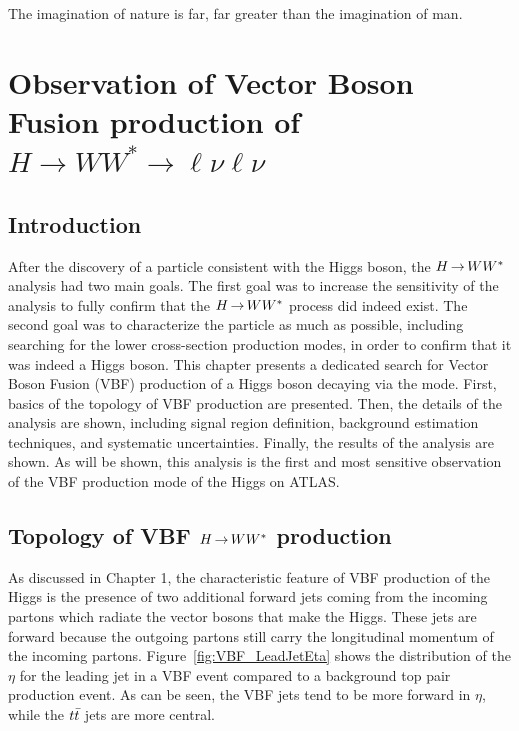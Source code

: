 \begin{savequote}[75mm]
The imagination of nature is far, far greater than the imagination of man.
\end{savequote}

\chapter{Observation of Vector Boson Fusion production of $H\rightarrow WW^{*}\rightarrow \ell\nu\ell\nu$}

\section{Introduction}

After the discovery of a particle consistent with the Higgs boson, the $H{\,{\rightarrow}\,}WW^\ast$ analysis had two main goals. The first goal was to increase the sensitivity of the analysis to fully confirm that the $H{\,{\rightarrow}\,}WW^\ast$ process did indeed exist. The second goal was to characterize the particle as much as possible, including searching for the lower cross-section production modes, in order to confirm that it was indeed a Higgs boson.   This chapter presents a dedicated search for Vector Boson Fusion (VBF) production of a Higgs boson decaying via the \HWWfull mode. First, basics of the topology of VBF production are presented. Then, the details of the analysis are shown, including signal region definition, background estimation techniques, and systematic uncertainties. Finally, the results of the analysis are shown. As will be shown, this analysis is the first and most sensitive observation of the VBF production mode of the Higgs on ATLAS.

\section{Topology of VBF $H{\,{\rightarrow}\,}WW^\ast$ production}

As discussed in Chapter 1, the characteristic feature of VBF production of the Higgs is the presence of two additional forward jets coming from the incoming partons which radiate the vector bosons that make the Higgs. These jets are forward because the outgoing partons still carry the longitudinal momentum of the incoming partons. Figure~\ref{fig:VBF_LeadJetEta} shows the distribution of the $\eta$ for the leading jet in a VBF event compared to a background top pair production event. As can be seen, the VBF jets tend to be more forward in $\eta$, while the $t\bar{t}$ jets are more central. 

